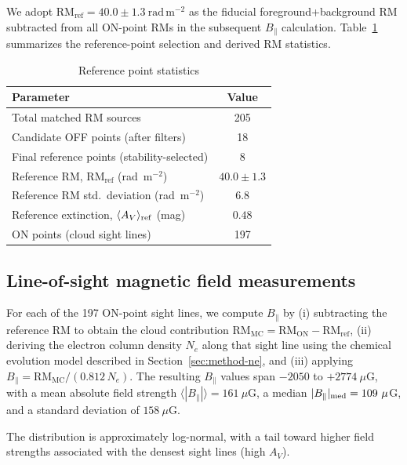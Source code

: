 \documentclass[twocolumn]{aastex631}
\begin{document}
We adopt $\mathrm{RM_{ref}} = 40.0 \pm 1.3~\mathrm{rad\,m^{-2}}$ as the fiducial foreground+background RM subtracted from all ON-point RMs in the subsequent $B_\parallel$ calculation. Table~\ref{tab:reference-statistics} summarizes the reference-point selection and derived RM statistics.

\begin{table}[htbp]
\centering
\caption{Reference point statistics}
\label{tab:reference-statistics}
\begin{tabular}{lc}
\toprule
Parameter & Value \\
\midrule
Total matched RM sources & 205 \\
Candidate OFF points (after filters) & 18 \\
Final reference points (stability-selected) & 8 \\
\midrule
Reference RM, $\mathrm{RM_{ref}}$ (rad~m$^{-2}$) & $40.0 \pm 1.3$ \\
Reference RM std.\ deviation (rad~m$^{-2}$) & $6.8$ \\
Reference extinction, $\langle A_V \rangle_{\rm ref}$ (mag) & $0.48$ \\
\midrule
ON points (cloud sight lines) & 197 \\
\bottomrule
\end{tabular}
\end{table}

\subsection{Line-of-sight magnetic field measurements}

For each of the 197 ON-point sight lines, we compute $B_\parallel$ by (i) subtracting the reference RM to obtain the cloud contribution $\mathrm{RM_{MC}} = \mathrm{RM_{ON}} - \mathrm{RM_{ref}}$, (ii) deriving the electron column density $N_e$ along that sight line using the chemical evolution model described in Section~\ref{sec:method-ne}, and (iii) applying $B_\parallel = \mathrm{RM_{MC}} / (0.812\,N_e)$. The resulting $B_\parallel$ values span $-2050$ to $+2774~\mu$G, with a mean absolute field strength $\langle |B_\parallel| \rangle = 161~\mu$G, a median $|B_\parallel|_{\rm med} = 109~\mu$G, and a standard deviation of $158~\mu$G.



The distribution is approximately log-normal, with a tail toward higher field strengths associated with the densest sight lines (high $A_V$).
\end{document}
